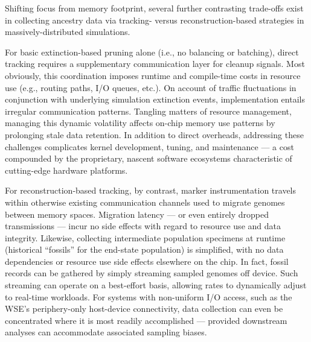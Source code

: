 Shifting focus from memory footprint, several further contrasting trade-offs exist in collecting ancestry data via tracking- versus reconstruction-based strategies in massively-distributed simulations.

For basic extinction-based pruning alone (i.e., no balancing or batching), direct tracking requires a supplementary communication layer for cleanup signals.
Most obviously, this coordination imposes runtime and compile-time costs in resource use (e.g., routing paths, I/O queues, etc.).
On account of traffic fluctuations in conjunction with underlying simulation extinction events, implementation entails irregular communication patterns.
Tangling matters of resource management, managing this dynamic volatility affects on-chip memory use patterns by prolonging stale data retention.
In addition to direct overheads, addressing these challenges complicates kernel development, tuning, and maintenance --- a cost compounded by the proprietary, nascent software ecosystems characteristic of cutting-edge hardware platforms.

For reconstruction-based tracking, by contrast, marker instrumentation travels within otherwise existing communication channels used to migrate genomes between memory spaces.
Migration latency --- or even entirely dropped transmissions --- incur no side effects with regard to resource use and data integrity.
Likewise, collecting intermediate population specimens at runtime (historical ``fossils'' for the end-state population) is simplified, with no data dependencies or resource use side effects elsewhere on the chip.
In fact, fossil records can be gathered by simply streaming sampled genomes off device.
Such streaming can operate on a best-effort basis, allowing rates to dynamically adjust to real-time workloads.
For systems with non-uniform I/O access, such as the WSE's periphery-only host-device connectivity, data collection can even be concentrated where it is most readily accomplished --- provided downstream analyses can accommodate associated sampling biases.

